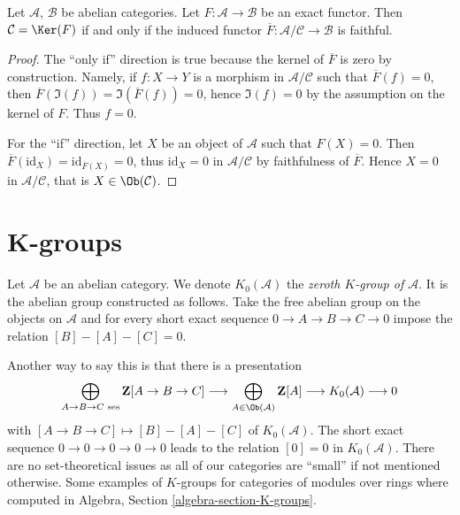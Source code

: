 \begin{lemma}
\label{lemma-quotient-by-kernel-exact-functor}
Let $\mathcal{A}$, $\mathcal{B}$ be abelian categories.
Let $F : \mathcal{A} \to \mathcal{B}$ be an exact functor.
Then $\mathcal{C} = \Ker(F)$ if and only if the induced functor
$\overline{F} : \mathcal{A}/\mathcal{C} \to \mathcal{B}$ is
faithful.
\end{lemma}

\begin{proof}
The ``only if'' direction is true because the kernel of $\overline{F}$ is zero
by construction. Namely, if $f : X \to Y$ is a morphism in
$\mathcal{A}/\mathcal{C}$ such that $\overline{F}(f) = 0$, then
$\overline{F}(\Im(f)) = \Im(\overline{F}(f)) = 0$, hence $\Im(f) = 0$ by the
assumption on the kernel of $F$. Thus $f = 0$.

\medskip\noindent
For the ``if'' direction, let $X$ be an object of $\mathcal{A}$ such that $F(X)
= 0$. Then $\overline{F}(\text{id}_X) = \text{id}_{\overline{F}(X)} = 0$, thus
$\text{id}_X = 0$ in $\mathcal{A}/\mathcal{C}$ by faithfulness of
$\overline{F}$. Hence $X = 0$ in $\mathcal{A}/\mathcal{C}$, that is $X \in
\Ob(\mathcal{C})$.
\end{proof}






\section{K-groups}
\label{section-K-groups}

\begin{definition}
\label{definition-K-zero}
Let $\mathcal{A}$ be an abelian category.
We denote $K_0(\mathcal{A})$ the
{\it zeroth $K$-group of $\mathcal{A}$}.
It is the abelian group constructed as follows.
Take the free abelian group
on the objects on $\mathcal{A}$
and for every short exact sequence
$0 \to A \to B \to C \to 0$
impose the relation $[B] - [A] - [C] = 0$.
\end{definition}

\noindent
Another way to say this is that there is a presentation
$$
\bigoplus_{A \to B \to C\text{ ses}}
\mathbf{Z}[A \to B \to C]
\longrightarrow
\bigoplus_{A \in \Ob(\mathcal{A})}
\mathbf{Z}[A]
\longrightarrow
K_0(\mathcal{A})
\longrightarrow
0
$$
with $[A \to B \to C] \mapsto [B] - [A] - [C]$ of $K_0(\mathcal{A})$.
The short exact sequence $0 \to 0 \to 0 \to 0 \to 0$
leads to the relation $[0] = 0$ in $K_0(\mathcal{A})$.
There are no set-theoretical issues as all of our categories
are ``small'' if not mentioned otherwise.
Some examples of $K$-groups for categories of modules
over rings where computed in
Algebra, Section \ref{algebra-section-K-groups}.

